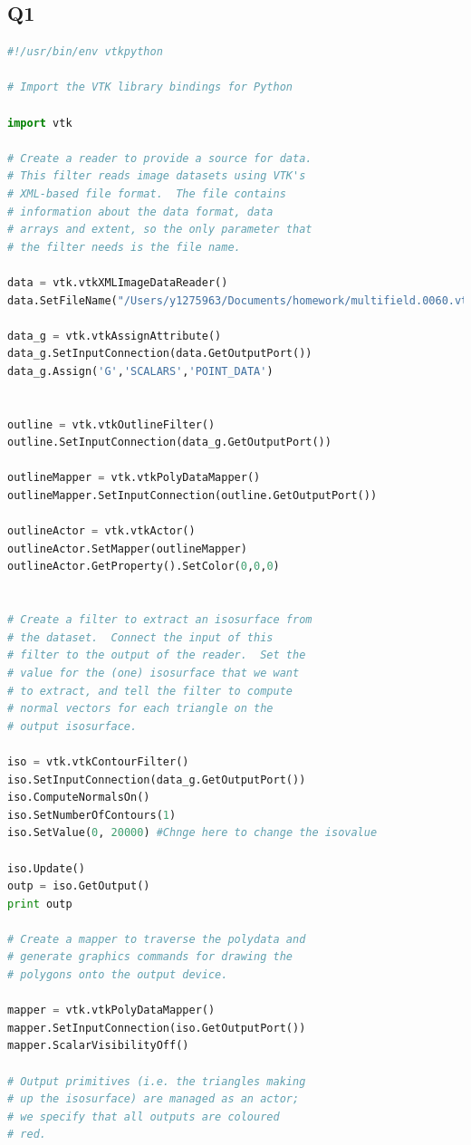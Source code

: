 \documentclass[11pt]{scrartcl}
\begin{document}
\subsection{Q1}
\label{code:Q1}
\begin{lstlisting}[language=Python]
#!/usr/bin/env vtkpython

# Import the VTK library bindings for Python

import vtk

# Create a reader to provide a source for data.
# This filter reads image datasets using VTK's
# XML-based file format.  The file contains
# information about the data format, data
# arrays and extent, so the only parameter that
# the filter needs is the file name.

data = vtk.vtkXMLImageDataReader()
data.SetFileName("/Users/y1275963/Documents/homework/multifield.0060.vti")

data_g = vtk.vtkAssignAttribute()
data_g.SetInputConnection(data.GetOutputPort())
data_g.Assign('G','SCALARS','POINT_DATA')


outline = vtk.vtkOutlineFilter()
outline.SetInputConnection(data_g.GetOutputPort())

outlineMapper = vtk.vtkPolyDataMapper()
outlineMapper.SetInputConnection(outline.GetOutputPort())

outlineActor = vtk.vtkActor()
outlineActor.SetMapper(outlineMapper)
outlineActor.GetProperty().SetColor(0,0,0)


# Create a filter to extract an isosurface from
# the dataset.  Connect the input of this
# filter to the output of the reader.  Set the
# value for the (one) isosurface that we want
# to extract, and tell the filter to compute
# normal vectors for each triangle on the
# output isosurface.

iso = vtk.vtkContourFilter()
iso.SetInputConnection(data_g.GetOutputPort())
iso.ComputeNormalsOn()
iso.SetNumberOfContours(1)
iso.SetValue(0, 20000) #Chnge here to change the isovalue

iso.Update()
outp = iso.GetOutput()
print outp

# Create a mapper to traverse the polydata and
# generate graphics commands for drawing the
# polygons onto the output device.

mapper = vtk.vtkPolyDataMapper()
mapper.SetInputConnection(iso.GetOutputPort())
mapper.ScalarVisibilityOff()

# Output primitives (i.e. the triangles making
# up the isosurface) are managed as an actor;
# we specify that all outputs are coloured
# red.


\end{lstlisting}
\end{document}
